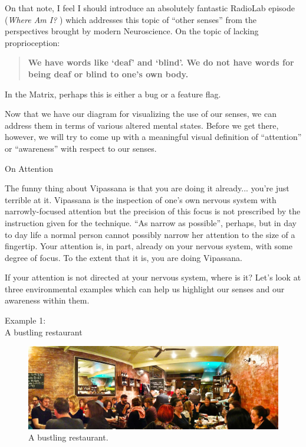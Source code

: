 \documentclass{article}
\begin{document}
On that note, I feel I should introduce an absolutely fantastic RadioLab episode (\textit{Where Am I?} \cite{whereami}) which addresses this topic of ``other senses'' from the perspectives brought by modern Neuroscience. On the topic of lacking proprioception:

\begin{quote}
  \textbf{We have words like `deaf' and `blind'. We do not have words for being deaf or blind to one's own body.}
\end{quote}

In the Matrix, perhaps this is either a bug or a feature flag.

Now that we have our diagram for visualizing the use of our senses, we can address them in terms of various altered mental states. Before we get there, however, we will try to come up with a meaningful visual definition of ``attention'' or ``awareness'' with respect to our senses.


\pagebreak

\begin{center}
  \Huge{On Attention}
\end{center}

The funny thing about Vipassana is that you are doing it already... you're just terrible at it. Vipassana is the inspection of one's own nervous system with narrowly-focused attention but the precision of this focus is not prescribed by the instruction given for the technique. ``As narrow as possible'', perhaps, but in day to day life a normal person cannot possibly narrow her attention to the size of a fingertip. Your attention is, in part, already on your nervous system, with some degree of focus. To the extent that it is, you are doing Vipassana.

If your attention is not directed at your nervous system, where is it? Let's look at three environmental examples which can help us highlight our senses and our awareness within them.

\pagebreak

\begin{center}
  \LARGE{Example 1:}\\
  \LARGE{A bustling restaurant}
\end{center}


\begin{figure}[h]
  \centering
  \includegraphics[width=\linewidth]{images/attention1-restaurant.jpg}
  \caption{A bustling restaurant.}
  \label{fig:bustling-restaurant}
\end{figure}
\end{document}
